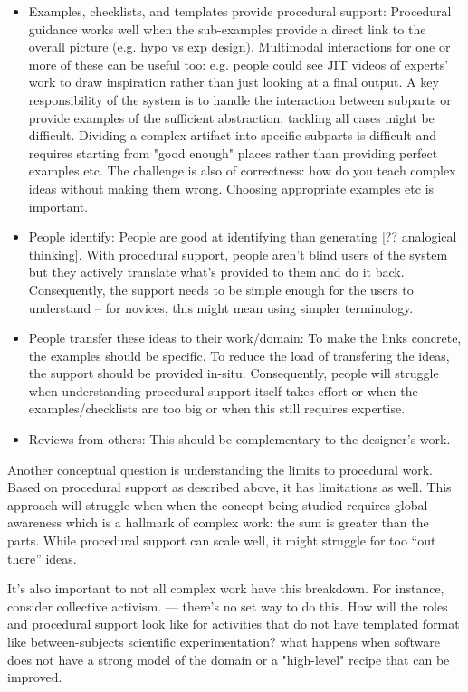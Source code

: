 \begin{itemize}
\item Examples, checklists, and templates provide procedural support: Procedural guidance works well when the sub-examples provide a direct link to the overall picture (e.g. hypo vs exp design).  Multimodal interactions for one or more of these can be useful too: e.g. people could see JIT videos of experts' work to draw inspiration rather than just looking at a final output. A key responsibility of the system is to handle the interaction between subparts or  provide examples of the sufficient abstraction; tackling all cases might be difficult. Dividing a complex artifact into specific subparts is difficult and requires starting from "good enough" places rather than providing perfect examples etc. The challenge is also of correctness: how do you teach complex ideas without making them wrong. Choosing appropriate examples etc is important.
\item People identify: People are good at identifying than generating [?? analogical thinking]. With procedural support, people aren’t blind users of the system but they actively translate what’s provided to them and do it back. Consequently, the support needs to be simple enough for the users to understand -- for novices, this might mean using simpler terminology. 
\item People transfer these ideas to their work/domain: To make the links concrete, the examples should be specific. To reduce the load of transfering the ideas, the support should be provided in-situ. Consequently, people will struggle when understanding procedural support itself takes effort or when the examples/checklists are too big or when this still requires expertise. 
\item Reviews from others: This should be complementary to the designer's work.
\end{itemize}

Another conceptual question is understanding the limits to procedural work. Based on procedural support as described above, it has limitations as well. This approach will struggle when when the concept being studied requires global awareness which is a hallmark of complex work: the sum is greater than the parts.  While procedural support can scale well, it might struggle for too “out there” ideas.

It's also important to not all complex work have this breakdown. For instance, consider collective activism. — there’s no set way to do this. How will the roles and procedural support look like for activities that do not have templated format like between-subjects scientific experimentation?  what happens when software does not have a strong model of the domain or a "high-level" recipe that can be improved.



